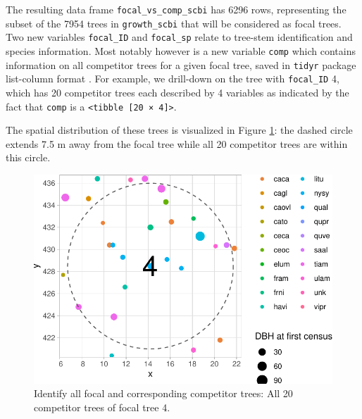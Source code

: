 \documentclass[12pt]{article}
\newenvironment{Shaded}{\begin{snugshade}}{\end{snugshade}}
\newcommand{\CommentTok}[1]{\textcolor[rgb]{0.56,0.35,0.01}{\textit{#1}}}
\newcommand{\DecValTok}[1]{\textcolor[rgb]{0.00,0.00,0.81}{#1}}
\newcommand{\KeywordTok}[1]{\textcolor[rgb]{0.13,0.29,0.53}{\textbf{#1}}}
\newcommand{\NormalTok}[1]{#1}
\newcommand{\OperatorTok}[1]{\textcolor[rgb]{0.81,0.36,0.00}{\textbf{#1}}}
\newcommand{\StringTok}[1]{\textcolor[rgb]{0.31,0.60,0.02}{#1}}
\begin{document}
The resulting data frame \texttt{focal\_vs\_comp\_scbi} has 6296 rows,
representing the subset of the 7954 trees in \texttt{growth\_scbi} that
will be considered as focal trees. Two new variables \texttt{focal\_ID}
and \texttt{focal\_sp} relate to tree-stem identification and species
information. Most notably however is a new variable \texttt{comp} which
contains information on all competitor trees for a given focal tree,
saved in \texttt{tidyr} package list-column format
\citet{tidyr_package}. For example, we drill-down on the tree with
\texttt{focal\_ID} 4, which has 20 competitor trees each described by 4
variables as indicated by the fact that \texttt{comp} is a
\texttt{\textless{}tibble\ {[}20\ ×\ 4{]}\textgreater{}}.

\begin{Shaded}
\end{Shaded}

The spatial distribution of these trees is visualized in Figure
\ref{fig:scbi-focal-vs-comp-map}: the dashed circle extends 7.5 m away
from the focal tree while all 20 competitor trees are within this
circle.

\begin{figure}

{\centering \includegraphics[width=0.66\linewidth]{Figures/scbi-focal-vs-comp-map-1} 

}

\caption{Identify all focal and corresponding competitor trees: All 20 competitor trees of focal tree 4.}\label{fig:scbi-focal-vs-comp-map}
\end{figure}
\end{document}

